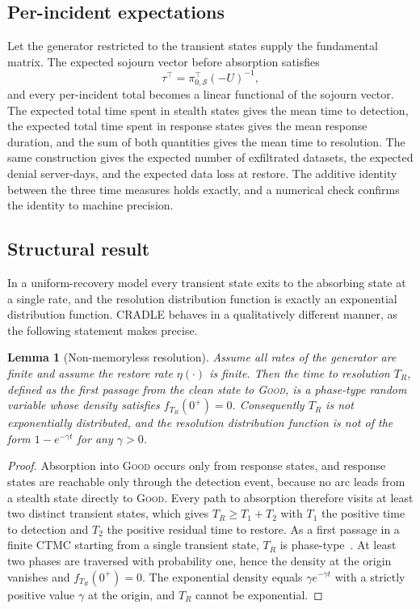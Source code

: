 \documentclass[journal]{IEEEtran}
\newtheorem{lemma}{Lemma}
\begin{document}
\subsection{Per-incident expectations}
Let the generator restricted to the transient states supply the fundamental
matrix. The expected sojourn vector before absorption satisfies
\begin{equation}
\tau^\top=\pi_{0,\mathcal{S}}^\top(-U)^{-1},
\label{eq:tau}
\end{equation}
and every per-incident total becomes a linear functional of the sojourn vector.
The expected total time spent in stealth states gives the mean time to detection,
the expected total time spent in response states gives the mean response
duration, and the sum of both quantities gives the mean time to resolution. The
same construction gives the expected number of exfiltrated datasets, the
expected denial server-days, and the expected data loss at restore. The additive
identity between the three time measures holds exactly, and a numerical check
confirms the identity to machine precision.

\subsection{Structural result}
In a uniform-recovery model every transient state exits to the absorbing state
at a single rate, and the resolution distribution function is exactly an
exponential distribution function. CRADLE behaves in a qualitatively different
manner, as the following statement makes precise.

\begin{lemma}[Non-memoryless resolution]\label{lem:nonexp}
Assume all rates of the generator are finite and assume the restore rate
$\eta(\cdot)$ is finite. Then the time to resolution $T_R$, defined as the first
passage from the clean state to \textnormal{\textsc{Good}}, is a phase-type random variable
whose density satisfies $f_{T_R}(0^+)=0$. Consequently $T_R$ is not
exponentially distributed, and the resolution distribution function is not of
the form $1-e^{-\gamma t}$ for any $\gamma>0$.
\end{lemma}
\begin{proof}
Absorption into \textsc{Good} occurs only from response states, and response
states are reachable only through the detection event, because no arc leads from
a stealth state directly to \textsc{Good}. Every path to absorption therefore
visits at least two distinct transient states, which gives $T_R\ge T_1+T_2$ with
$T_1$ the positive time to detection and $T_2$ the positive residual time to
restore. As a first passage in a finite CTMC starting from a single transient
state, $T_R$ is phase-type~\cite{latouche1999matrix}. At least two phases are
traversed with probability one, hence the density at the origin vanishes and
$f_{T_R}(0^+)=0$. The exponential density equals $\gamma e^{-\gamma t}$ with a
strictly positive value $\gamma$ at the origin, and $T_R$ cannot be exponential.
\end{proof}
\end{document}
